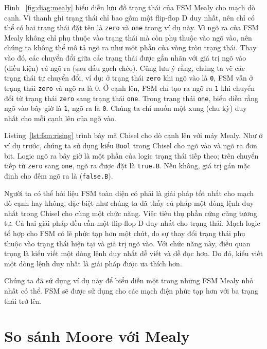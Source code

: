 \documentclass[%
    10pt,
    headinclude, footexclude,
    openright, %
    notitlepage,
    cleardoubleempty,
    headsepline,
    pointlessnumbers,
    bibtotoc, idxtotoc,
    ]{scrbook}
\newcommand{\code}[1]{{\small{\texttt{#1}}}}
\begin{document}
Hình ~\ref{fig:diag:mealy} biểu diễn lưu đồ trạng thái của FSM Mealy cho mạch dò cạnh. Vì thanh ghi trạng thái chỉ bao gồm một flip-flop D duy nhất, nên chỉ có thể có hai trạng thái đặt tên là \code{zero} và \code{one} trong ví dụ này. Vì ngõ ra của FSM Mealy không chỉ phụ thuộc vào trạng thái mà còn phụ thuộc vào ngõ vào, nên chúng ta không thể mô tả ngõ ra như một phần của vòng tròn trạng thái. Thay vào đó, các chuyển đổi giữa các trạng thái được gắn nhãn với giá trị ngõ vào (điều kiện) \emph{và} ngõ ra (sau dấu gạch chéo). Cũng lưu ý rằng, chúng ta vẽ các trạng thái tự chuyển đổi, ví dụ: ở trạng thái \code{zero} khi ngõ vào là \code{0}, FSM vẫn ở trạng thái \code{zero} và ngõ ra là {0}. Ở cạnh lên, FSM chỉ tạo ra ngõ ra \code{1} khi chuyển đổi từ trạng thái \code{zero} sang trạng thái \code{one}. Trong trạng thái \code{one}, biểu diễn rằng ngõ vào bây giờ là \code{1}, ngõ ra là \code{0}. Chúng ta chỉ muốn một xung (chu kỳ) duy nhất cho mỗi cạnh lên của ngõ vào. 


Listing~\ref{lst:fsm:rising} trình bày mã Chisel cho dò cạnh lên với máy Mealy.
Như ở ví dụ trước, chúng ta sử dụng kiểu \code{Bool} trong Chisel cho ngõ vào và ngõ ra đơn bit.
Logic ngõ ra bây giờ là một phần của logic trạng thái tiếp theo; trên chuyển tiếp từ
\code{zero} sang \code{one}, ngõ ra được đặt là \code{true.B}. Nếu không,
giá trị gán mặc định cho đếm ngõ ra là (\code{false.B}).

Người ta có thể hỏi liệu FSM toàn diện có phải là giải pháp tốt nhất cho mạch dò cạnh hay không, đặc biệt như chúng ta đã thấy cú pháp một dòng lệnh duy nhất trong Chisel cho cùng một chức năng. Việc tiêu thụ phần cứng cũng tương tự. Cả hai giải pháp đều cần một flip-flop D duy nhất cho trạng thái. Mạch logic tổ hợp cho FSM có lẽ phức tạp hơn một chút, do sự thay đổi trạng thái phụ thuộc vào trạng thái hiện tại và giá trị ngõ vào. Với chức năng này, điều quan trọng là kiểu viết một dòng lệnh duy nhất dễ viết và dễ đọc hơn. Do đó, kiểu viết một dòng lệnh duy nhất là giải pháp được ưa thích hơn.

Chúng ta đã sử dụng ví dụ này để biểu diễn một trong những FSM Mealy nhỏ nhất có thể. FSM sẽ được sử dụng cho các mạch điện phức tạp hơn với ba trạng thái trở lên. 

\section{So sánh Moore với Mealy}
\end{document}

